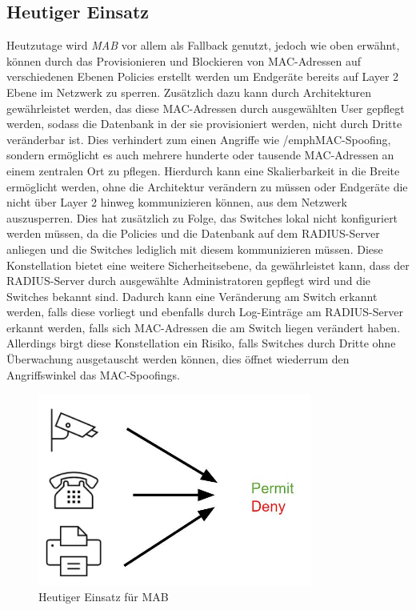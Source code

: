 \documentclass[conference]{IEEEtran}
\begin{document}
\subsection{Heutiger Einsatz}
Heutzutage wird \emph{MAB} vor allem als Fallback genutzt, jedoch wie oben erwähnt, können durch das Provisionieren und Blockieren von MAC-Adressen auf verschiedenen Ebenen Policies erstellt werden um Endgeräte bereits auf Layer 2 Ebene im Netzwerk zu sperren. Zusätzlich dazu kann durch Architekturen gewährleistet werden, das diese MAC-Adressen durch ausgewählten User gepflegt werden, sodass die Datenbank in der sie provisioniert werden, nicht durch Dritte veränderbar ist. Dies verhindert zum einen Angriffe wie /emph{MAC-Spoofing}, sondern ermöglicht es auch mehrere hunderte oder tausende MAC-Adressen an einem zentralen Ort zu pflegen. Hierdurch kann eine Skalierbarkeit in die Breite ermöglicht werden, ohne die Architektur verändern zu müssen oder Endgeräte die nicht über Layer 2 hinweg kommunizieren können, aus dem Netzwerk auszusperren. Dies hat zusätzlich zu Folge, das Switches lokal nicht konfiguriert werden müssen, da die Policies und die Datenbank auf dem RADIUS-Server anliegen und die Switches lediglich mit diesem kommunizieren müssen.
Diese Konstellation bietet eine weitere Sicherheitsebene, da gewährleistet kann, dass der RADIUS-Server durch ausgewählte Administratoren gepflegt wird und die Switches bekannt sind. Dadurch kann eine Veränderung am Switch erkannt werden, falls diese vorliegt und ebenfalls durch Log-Einträge am RADIUS-Server erkannt werden, falls sich MAC-Adressen die am Switch liegen verändert haben. Allerdings birgt diese Konstellation ein Risiko, falls Switches durch Dritte ohne Überwachung ausgetauscht werden können, dies öffnet wiederrum den Angriffswinkel das MAC-Spoofings.
\begin{figure}[hbt]
	\centering
	\includegraphics[width=9cm]{figures/MAB_heutiger_Einsatz}
	\caption{Heutiger Einsatz für MAB}
	\label{fig:mab-today}
\end{figure}
\end{document}
